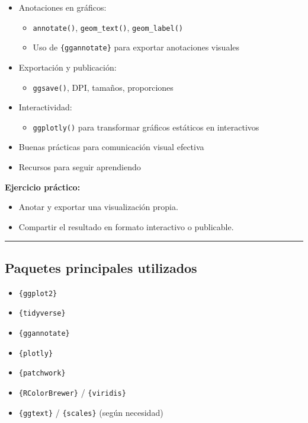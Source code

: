 \documentclass[
  11pt,
  letterpaper,
  DIV=11,
  numbers=noendperiod]{scrartcl}
\providecommand{\tightlist}{%
  \setlength{\itemsep}{0pt}\setlength{\parskip}{0pt}}\usepackage{longtable,booktabs,array}
\begin{document}
\begin{itemize}
\tightlist
\item
  Anotaciones en gráficos:

  \begin{itemize}
  \tightlist
  \item
    \texttt{annotate()}, \texttt{geom\_text()}, \texttt{geom\_label()}
  \item
    Uso de \texttt{\{ggannotate\}} para exportar anotaciones visuales
  \end{itemize}
\item
  Exportación y publicación:

  \begin{itemize}
  \tightlist
  \item
    \texttt{ggsave()}, DPI, tamaños, proporciones
  \end{itemize}
\item
  Interactividad:

  \begin{itemize}
  \tightlist
  \item
    \texttt{ggplotly()} para transformar gráficos estáticos en
    interactivos
  \end{itemize}
\item
  Buenas prácticas para comunicación visual efectiva
\item
  Recursos para seguir aprendiendo
\end{itemize}

\textbf{Ejercicio práctico:}

\begin{itemize}
\tightlist
\item
  Anotar y exportar una visualización propia.
\item
  Compartir el resultado en formato interactivo o publicable.
\end{itemize}

\begin{center}\rule{0.5\linewidth}{0.5pt}\end{center}

\subsection{Paquetes principales
utilizados}\label{paquetes-principales-utilizados}

\begin{itemize}
\tightlist
\item
  \texttt{\{ggplot2\}}
\item
  \texttt{\{tidyverse\}}
\item
  \texttt{\{ggannotate\}}
\item
  \texttt{\{plotly\}}
\item
  \texttt{\{patchwork\}}
\item
  \texttt{\{RColorBrewer\}} / \texttt{\{viridis\}}
\item
  \texttt{\{ggtext\}} / \texttt{\{scales\}} (según necesidad)
\end{itemize}
\end{document}
